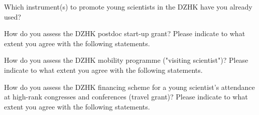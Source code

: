 \documentclass[
  english,
  globalid=09-2019-v4-Young-DZHK,
  print_questionnaire_id,
  pagemark,
  stamp]{sdaps}
\begin{document}
\begin{questionnaire}
\begin{choicequestion}[4]{Which instrument(s) to promote young scientists 
in the DZHK have you already used?}
    \end{choicequestion}
 
\begin{choicegroup}{How do you assess the DZHK postdoc start-up grant? 
Please indicate to what extent you agree with the
following statements.}


      
\vspace{0.2cm}

    \end{choicegroup}

 
    

    
\begin{choicegroup}{How do you assess the DZHK mobility programme ("visiting 
scientist")? Please indicate to what extent you agree
with the following statements.
}


      
\vspace{0.2cm}
    \end{choicegroup}
    
    
\begin{choicegroup}{How do you assess the DZHK financing scheme for a young 
scientist's attendance at high-rank congresses and
conferences (travel grant)? Please indicate to what extent you agree with the 
following statements.}



\end{choicegroup}
\end{questionnaire}
\end{document}
